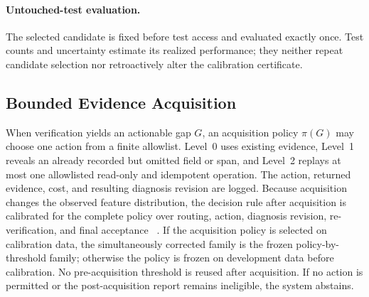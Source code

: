 \paragraph{Untouched-test evaluation.}
The selected candidate is fixed before test access and evaluated exactly once.
Test counts and uncertainty estimate its realized performance; they neither
repeat candidate selection nor retroactively alter the calibration certificate.

\subsection{Bounded Evidence Acquisition}

When verification yields an actionable gap $G$, an acquisition policy
$\pi(G)$ may choose one action from a finite allowlist. Level~0 uses existing
evidence, Level~1 reveals an already recorded but omitted field or span, and
Level~2 replays at most one allowlisted read-only and idempotent operation. The
action, returned evidence, cost, and resulting diagnosis revision are logged.
Because acquisition changes the observed feature distribution, the decision
rule after acquisition is calibrated for the complete policy over routing,
action, diagnosis revision, re-verification, and final acceptance
~\cite{xu2026bcea}. If the acquisition policy is selected on calibration data,
the simultaneously corrected family is the frozen policy-by-threshold family;
otherwise the policy is frozen on development data before calibration. No
pre-acquisition threshold is reused after acquisition. If no action is
permitted or the post-acquisition report remains ineligible, the system
abstains.
